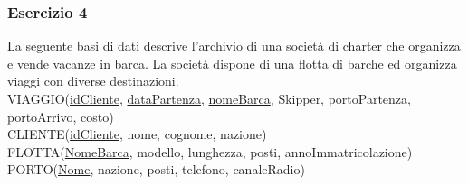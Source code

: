 \documentclass[a4paper]{article}
\begin{document}
\subsubsection{Esercizio 4}
La seguente basi di dati descrive l'archivio di una società di charter che organizza e vende vacanze in barca. La società dispone di una flotta di barche ed organizza viaggi con diverse destinazioni.\medskip\\
VIAGGIO(\underline{idCliente}, \underline{dataPartenza}, \underline{nomeBarca}, Skipper, portoPartenza, portoArrivo, costo)\\
CLIENTE(\underline{idCliente}, nome, cognome, nazione)\\
FLOTTA(\underline{NomeBarca}, modello, lunghezza, posti, annoImmatricolazione)\\
PORTO(\underline{Nome}, nazione, posti, telefono, canaleRadio)
\end{document}
